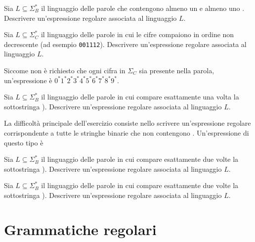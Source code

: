 \begin{Exercise}[label=0e1-er]
	Sia $L\subseteq \Sigma_{B}^{*}$ il linguaggio delle parole che contengono almeno un \uno e almeno uno \zero.
	Descrivere un'espressione regolare associata al linguaggio $L$.
\end{Exercise}



\begin{Exercise}[label=re-crescente]
	Sia $L\subseteq \Sigma_{C}^{*}$ il linguaggio delle parole in cui le cifre compaiono in ordine non decrescente (ad esempio
	\texttt{001112}).
	Descrivere un'espressione regolare associata al linguaggio $L$.
\end{Exercise}

\begin{Answer}
	Siccome non è richiesto che ogni cifra in $\Sigma_{C}$ sia presente nella parola, un'espressione è $0^{*}1^{*}2^{*}3^{*}4^{*}5^{*}6^{*}7^{*}8^{*}9^{*}$.
\end{Answer}


\begin{Exercise}[label=re-1-101]
	Sia $L\subseteq \Sigma_{B}^{*}$ il linguaggio delle parole in cui compare esattamente una volta la sottostringa
	\zero\uno\uno\zero\uno\zero\uno).
	Descrivere un'espressione regolare associata al linguaggio $L$.
\end{Exercise}

\begin{Answer}
	La difficoltà principale dell'esercizio consiste nello scrivere un'espressione regolare corrispondente a tutte le
	stringhe binarie che non contengono \zero\uno\uno\zero\uno\zero\uno.
	Un'espressione di questo tipo è
\end{Answer}

\begin{Exercise}[label=re-2-101]
	Sia $L\subseteq \Sigma_{B}^{*}$ il linguaggio delle parole in cui compare esattamente due volte la sottostringa
	\zero\uno\uno\zero\uno\zero\uno).
	Descrivere un'espressione regolare associata al linguaggio $L$.
\end{Exercise}

\begin{Exercise}[label=re-2-11]
	Sia $L\subseteq \Sigma_{B}^{*}$ il linguaggio delle parole in cui compare esattamente due volte la sottostringa
	\uno\uno).
	Descrivere un'espressione regolare associata al linguaggio $L$.
\end{Exercise}


\section{Grammatiche regolari}\label{sec:grammatiche-regolari}

